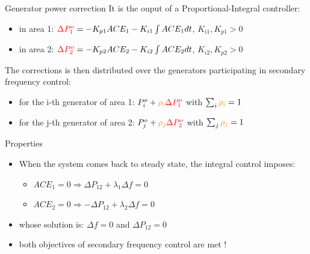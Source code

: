 \begin{frame}{Generator power correction}
  It is the ouput of a Proportional-Integral controller:
    \begin{itemize}
        \item in area 1: ${\color{red} \Delta P_1^o} = -K_{p1} ACE_1 - K_{i1} \int ACE_1 dt$, \quad $K_{i1},K_{p1} > 0$ 
        \item in area 2: ${\color{red} \Delta P_2^o} = -K_{p2} ACE_2 - K_{i2} \int ACE_2 dt$, \quad $K_{i2},K_{p2} > 0$ 
    \end{itemize}
    
    The corrections is then distributed over the generators participating in secondary frequency control:
    \begin{itemize}
        \item for the i-th generator of area 1: $P_i^o + {\color{orange}\rho_i} {\color{red} \Delta P_1^o}$ with $\sum_{i} {\color{orange}\rho_i} = 1$ 
        \item for the j-th generator of area 2: $P_j^o + {\color{orange}\rho_j} {\color{red} \Delta P_2^o}$ with $\sum_{j} {\color{orange}\rho_j} = 1$ 
    \end{itemize}
\end{frame}


\begin{frame}{Properties}
    \begin{itemize}
        \item When the system comes back to steady state, the integral control imposes: 
        \begin{itemize}
            \item $ACE_1 = 0 \Rightarrow \Delta P_{12} + \lambda_1 \Delta f = 0$
            \item $ACE_2 = 0 \Rightarrow -\Delta P_{12} + \lambda_2 \Delta f = 0$
        \end{itemize}
        \item whose solution is: $\Delta f = 0$ and $\Delta P_{12} = 0$ 
        \item both objectives of secondary frequency control are met ! 
    \end{itemize}
  \end{frame}


